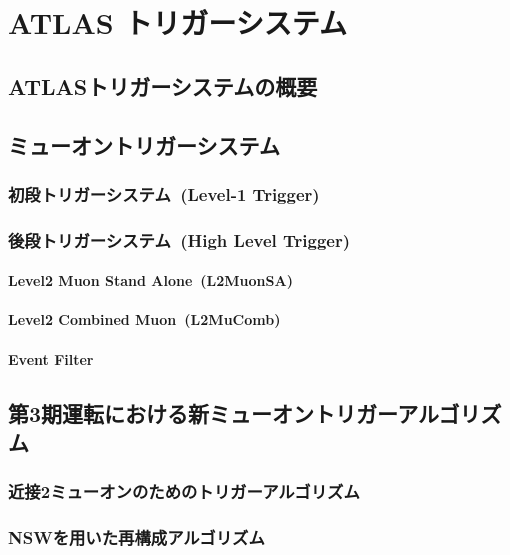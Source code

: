 \chapter{ATLAS トリガーシステム}\label{chapter3}

\section{ATLASトリガーシステムの概要}\label{chapter3-1}

\section{ミューオントリガーシステム}\label{chapter3-2}

\subsection{初段トリガーシステム~(Level-1 Trigger)}\label{chapter3-2-1}

\subsection{後段トリガーシステム~(High Level Trigger)}\label{chapter3-2-2}

\subsubsection{Level2 Muon Stand Alone~(L2MuonSA)}

\subsubsection{Level2 Combined Muon~(L2MuComb)}

\subsubsection{Event Filter}

\section{第3期運転における新ミューオントリガーアルゴリズム}\label{chapter3-3}

\subsection{近接2ミューオンのためのトリガーアルゴリズム}\label{chapter3-3-1}

\subsection{NSWを用いた再構成アルゴリズム}\label{chapter3-3-2}